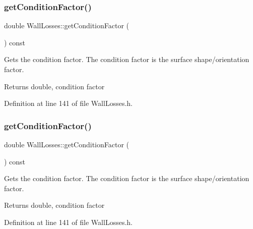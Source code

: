 \subsubsection{\texorpdfstring{get\+Condition\+Factor()}{getConditionFactor()}\hspace{0.1cm}{\footnotesize\ttfamily [1/3]}}
{\footnotesize\ttfamily double Wall\+Losses\+::get\+Condition\+Factor (\begin{DoxyParamCaption}{ }\end{DoxyParamCaption}) const\hspace{0.3cm}{\ttfamily [inline]}}

Gets the condition factor. The condition factor is the surface shape/orientation factor. \begin{DoxyReturn}{Returns}
double, condition factor 
\end{DoxyReturn}


Definition at line 141 of file Wall\+Losses.\+h.

\mbox{\label{class_wall_losses_a16ab4003a17f9e95f28b9390b92c2b27}} 
\subsubsection{\texorpdfstring{get\+Condition\+Factor()}{getConditionFactor()}\hspace{0.1cm}{\footnotesize\ttfamily [2/3]}}
{\footnotesize\ttfamily double Wall\+Losses\+::get\+Condition\+Factor (\begin{DoxyParamCaption}{ }\end{DoxyParamCaption}) const\hspace{0.3cm}{\ttfamily [inline]}}

Gets the condition factor. The condition factor is the surface shape/orientation factor. \begin{DoxyReturn}{Returns}
double, condition factor 
\end{DoxyReturn}


Definition at line 141 of file Wall\+Losses.\+h.

\mbox{\label{class_wall_losses_a16ab4003a17f9e95f28b9390b92c2b27}} 
